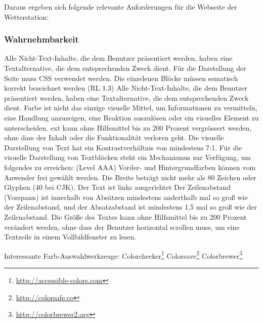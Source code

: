 


Daraus ergeben sich folgende relevante Anforderungen für die Webseite der Wetterstation:


\subsubsection*{Wahrnehmbarkeit}
Alle Nicht-Text-Inhalte, die dem Benutzer präsentiert werden, haben eine Textalternative, die dem entsprechenden Zweck dient.
Für die Darstellung der Seite muss CSS verwendet werden. Die einzelenen Blöcke müssen sematisch korrekt bezeichnet werden (RL 1.3)
Alle Nicht-Text-Inhalte, die dem Benutzer präsentiert werden, haben eine Textalternative, die dem entsprechenden Zweck dient.
Farbe ist nicht das einzige visuelle Mittel, um Informationen zu vermitteln, eine Handlung anzuzeigen, eine Reaktion auszulösen oder ein visuelles Element zu unterscheiden. ext kann ohne Hilfsmittel bis zu 200 Prozent vergrössert werden, ohne dass der Inhalt oder die Funktionalität verloren geht. Die visuelle Darstellung von Text hat ein Kontrastverhältnis von mindestens 7:1.
Für die visuelle Darstellung von Textblöcken steht ein Mechanismus zur Verfügung, um folgendes zu erreichen: (Level AAA)
Vorder- und Hintergrundfarben können vom Anwender frei gewählt werden.
Die Breite beträgt nicht mehr als 80 Zeichen oder Glyphen (40 bei CJK).
Der Text ist links ausgerichtet
Der Zeilenabstand (Vorspann) ist innerhalb von Absätzen mindestens anderthalb mal so groß wie der Zeilenabstand, und der Absatzabstand ist mindestens 1,5 mal so groß wie der Zeilenabstand.
Die Größe des Textes kann ohne Hilfsmittel bis zu 200 Prozent verändert werden, ohne dass der Benutzer horizontal scrollen muss, um eine Textzeile in einem Vollbildfenster zu lesen.

Interessante Farb-Auswahlwerkzeuge:
Colorchecker\footnote{ \url{http://accessible-colors.com}} 
Colorsave\footnote{ \url{http://colorsafe.co}} 
Colorbrewer\footnote{ \url{http://colorbrewer2.org}} 


